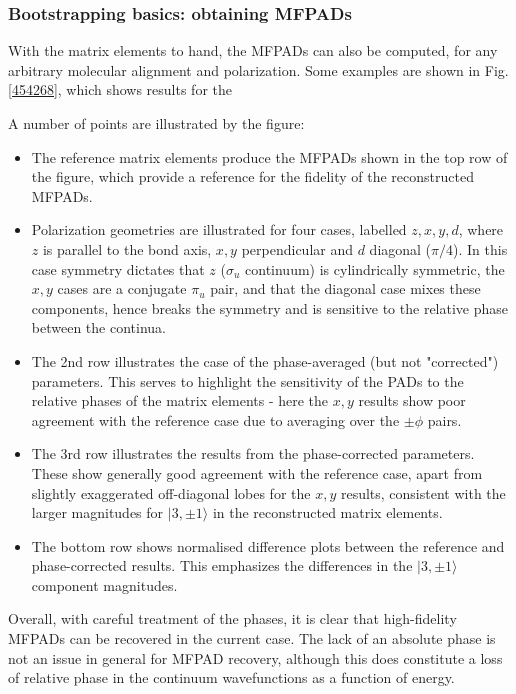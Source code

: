\subsubsection{Bootstrapping basics: obtaining MFPADs}

With the matrix elements to hand, the MFPADs can also be computed, for any arbitrary molecular alignment and polarization. Some examples are shown in Fig. \ref{454268}, which shows results for the 

A number of points are illustrated by the figure:

\begin{itemize}
\item The reference matrix elements produce the MFPADs shown in the top row of the figure, which provide a reference for the fidelity of the reconstructed MFPADs. 
\item Polarization geometries are illustrated for four cases, labelled $z,x,y,d$, where $z$ is parallel to the bond axis, $x,y$ perpendicular and $d$ diagonal ($\pi/4$). In this case symmetry dictates that $z$ ($\sigma_u$ continuum) is cylindrically symmetric, the $x,y$ cases are a conjugate $\pi_u$ pair, and that the diagonal case mixes these components, hence breaks the symmetry and is sensitive to the relative phase between the continua.
\item The 2nd row illustrates the case of the phase-averaged (but not "corrected") parameters. This serves to highlight the sensitivity of the PADs to the relative phases of the matrix elements - here the $x,y$ results show poor agreement with the reference case due to averaging over the $\pm\phi$ pairs.
\item The 3rd row illustrates the results from the phase-corrected parameters. These show generally good agreement with the reference case, apart from slightly exaggerated off-diagonal lobes for the $x,y$ results, consistent with the larger magnitudes for $|3,\pm1\rangle$ in the reconstructed matrix elements.
\item The bottom row shows normalised difference plots between the reference and phase-corrected results. This emphasizes the differences in the $|3,\pm1\rangle$ component magnitudes.
\end{itemize}

Overall, with careful treatment of the phases, it is clear that high-fidelity MFPADs can be recovered in the current case. The lack of an absolute phase is not an issue in general for MFPAD recovery, although this does constitute a loss of relative phase in the continuum wavefunctions as a function of energy. %

